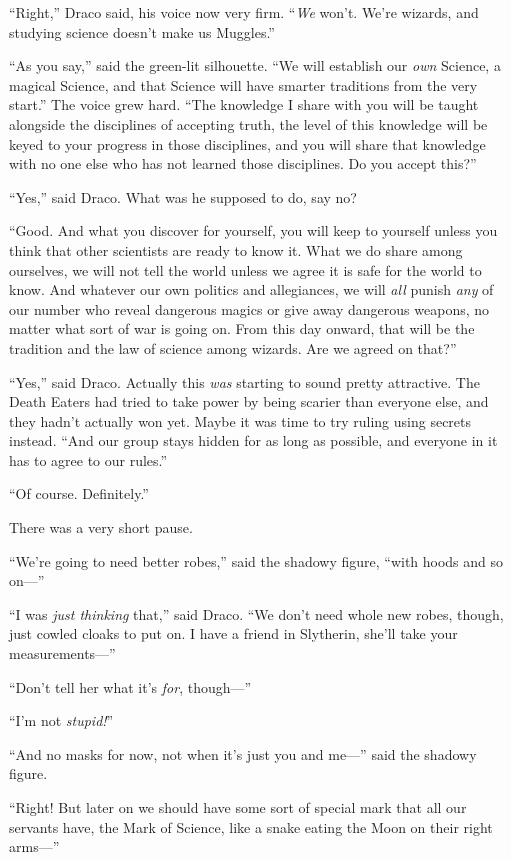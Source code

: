 “Right,” Draco said, his voice now very firm. “\emph{We} won’t. We’re wizards,
and studying science doesn’t make us Muggles.”

“As you say,” said the green-lit silhouette. “We will establish our \emph{own}
Science, a magical Science, and that Science will have smarter traditions from
the very start.” The voice grew hard. “The knowledge I share with you will be
taught alongside the disciplines of accepting truth, the level of this
knowledge will be keyed to your progress in those disciplines, and you will
share that knowledge with no one else who has not learned those disciplines. Do
you accept this?”

“Yes,” said Draco. What was he supposed to do, say no?

“Good. And what you discover for yourself, you will keep to yourself unless you
think that other scientists are ready to know it. What we do share among
ourselves, we will not tell the world unless we agree it is safe for the world
to know. And whatever our own politics and allegiances, we will \emph{all}
punish \emph{any} of our number who reveal dangerous magics or give away
dangerous weapons, no matter what sort of war is going on. From this day
onward, that will be the tradition and the law of science among wizards. Are we
agreed on that?”

“Yes,” said Draco. Actually this \emph{was} starting to sound pretty
attractive. The Death Eaters had tried to take power by being scarier than
everyone else, and they hadn’t actually won yet. Maybe it was time to try
ruling using secrets instead. “And our group stays hidden for as long as
possible, and everyone in it has to agree to our rules.”

“Of course. Definitely.”

There was a very short pause.

“We’re going to need better robes,” said the shadowy figure, “with hoods and so
on—”

“I was \emph{just thinking} that,” said Draco. “We don’t need whole new robes,
though, just cowled cloaks to put on. I have a friend in Slytherin, she’ll take
your measurements—”

“Don’t tell her what it’s \emph{for}, though—”

“I’m not \emph{stupid!}”

“And no masks for now, not when it’s just you and me—” said the shadowy
figure.

“Right! But later on we should have some sort of special mark that all our
servants have, the Mark of Science, like a snake eating the Moon on their right
arms—”

